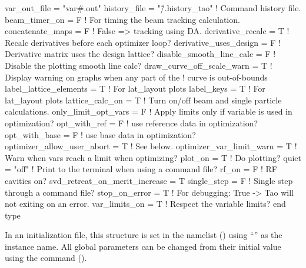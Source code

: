 {{{{{{{{\begin{example}
  var_out_file  = "var#.out"
  history_file = "\~/.history_tao"  ! Command history file.
  beam_timer_on = F                ! For timing the beam tracking calculation.
  concatenate_maps = F             ! False => tracking using DA.
  derivative_recalc = T            ! Recalc derivatives before each optimizer loop?
  derivative_uses_design = F       ! Derivative matrix uses the design lattice?
  disable_smooth_line_calc = F     ! Disable the plotting smooth line calc?
  draw_curve_off_scale_warn = T    ! Display warning on graphs when any part of the 
                                   !   curve is out-of-bounds
  label_lattice_elements = T       ! For lat_layout plots
  label_keys = T                   ! For lat_layout plots
  lattice_calc_on = T              ! Turn on/off beam and single particle calculations.
  only_limit_opt_vars = F          ! Apply limits only if variable is used in optimization?
  opt_with_ref = F                 ! use reference data in optimization?
  opt_with_base = F                ! use base data in optimization?
  optimizer_allow_user_abort = T   ! See below.
  optimizer_var_limit_warn = T     ! Warn when vars reach a limit when optimizing?
  plot_on = T                      ! Do plotting?
  quiet = "off"                    ! Print to the terminal when using a command file?
  rf_on = F                        ! RF cavities on?
  svd_retreat_on_merit_increase = T    
  single_step = F                  ! Single step through a command file?
  stop_on_error = T                ! For debugging: True -> Tao will not exiting on an error.
  var_limits_on = T                ! Respect the variable limits?
end type
\end{example}

In an initialization file, this structure is set in the  namelist ()
using ``'' as the instance name. All global parameters can be changed from their initial
value using the  command ().

}}}}}}}}
